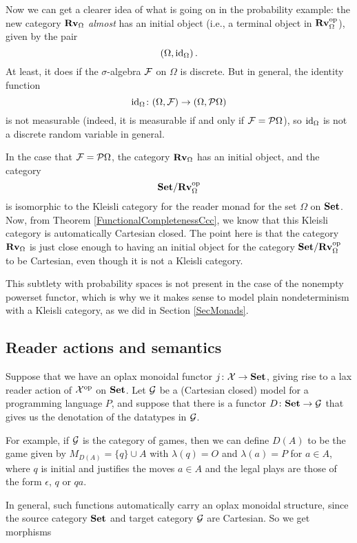 \documentclass{article}
\begin{document}
Now we can get a clearer idea of what is going on in the probability example: the new category ${\normalfont\textbf{Rv}}_\Omega$ \emph{almost} has an initial object (i.e., a terminal object in ${\normalfont\textbf{Rv}}_\Omega^{\mathrm{op}}$), given by the pair
\[
  (\Omega,\operatorname{id}_\Omega)\,.
  \]
At least, it does if the $\sigma$-algebra $\mathcal F$ on $\Omega$ is discrete.  
But in general, the identity function
\[
  \operatorname{id}_\Omega \colon (\Omega,\mathcal F) \to (\Omega,\mathcal P\Omega)
  \]
is not measurable (indeed, it is measurable if and only if $\mathcal F=\mathcal P\Omega$), so $\operatorname{id}_\Omega$ is not a discrete random variable in general.

In the case that $\mathcal F=\mathcal P\Omega$, the category ${\normalfont\textbf{Rv}}_\Omega$ has an initial object, and the category
\[
  {\normalfont\textbf{Set}}/{\normalfont\textbf{Rv}}_\Omega^{\mathrm{op}}
  \]
is isomorphic to the Kleisli category for the reader monad for the set $\Omega$ on ${\normalfont\textbf{Set}}$.  
Now, from Theorem \ref{FunctionalCompletenessCcc}, we know that this Kleisli category is automatically Cartesian closed.  
The point here is that the category ${\normalfont\textbf{Rv}}_\Omega$ is just close enough to having an initial object for the category ${\normalfont\textbf{Set}}/{\normalfont\textbf{Rv}}_\Omega^{\mathrm{op}}$ to be Cartesian, even though it is not a Kleisli category.

\begin{remark}
  This subtlety with probability spaces is not present in the case of the nonempty powerset functor, which is why we it makes sense to model plain nondeterminism with a Kleisli category, as we did in Section \ref{SecMonads}.
\end{remark}

\subsection{Reader actions and semantics}

Suppose that we have an oplax monoidal functor $j \colon \mathcal X \to {\normalfont\textbf{Set}}$, giving rise to a lax reader action of $\mathcal X^{\mathrm{op}}$ on ${\normalfont\textbf{Set}}$.
Let $\mathcal G$ be a (Cartesian closed) model for a programming language $P$, and suppose that there is a functor $D\colon {\normalfont\textbf{Set}} \to \mathcal G$ that gives us the denotation of the datatypes in $\mathcal G$.

For example, if $\mathcal G$ is the category of games, then we can define $D(A)$ to be the game given by $M_{D(A)} = \{q\}\cup A$ with $\lambda(q)=O$ and $\lambda(a)=P$ for $a\in A$, where $q$ is initial and justifies the moves $a\in A$ and the legal plays are those of the form $\epsilon$, $q$ or $qa$.

In general, such functions automatically carry an oplax monoidal structure, since the source category ${\normalfont\textbf{Set}}$ and target category $\mathcal G$ are Cartesian.  
So we get morphisms
\end{document}
